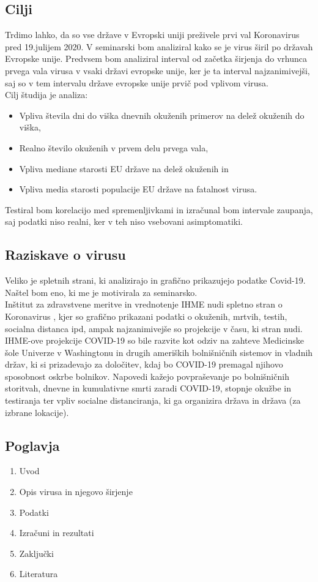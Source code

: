 \documentclass[a4paper,11pt]{article}
\begin{document}
\subsection{Cilji}
Trdimo lahko, da so vse države v Evropski uniji \cite{eu} preživele prvi val Koronavirus pred 19.julijem 2020. V seminarski bom analiziral kako se je virus širil po državah Evropske unije. Predvsem bom analiziral interval od začetka širjenja do vrhunca prvega vala virusa v vsaki državi evropske unije, ker je ta interval najzanimivejši, saj so v tem intervalu države evropske unije prvič pod vplivom virusa. \\
Cilj študija je analiza:
\begin{itemize}
\item{Vpliva števila dni do viška dnevnih okuženih primerov na delež okuženih do viška,}
\item{Realno število okuženih v prvem delu prvega vala,}
\item{Vpliva mediane starosti EU države na delež okuženih in}
\item{Vpliva media starosti populacije EU države na fatalnost virusa.}
\end{itemize}
Testiral bom korelacijo med spremenljivkami in izračunal bom intervale zaupanja, saj podatki niso realni, ker v teh niso vsebovani asimptomatiki.

\subsection{Raziskave o virusu}
Veliko je spletnih strani, ki analizirajo in grafično prikazujejo podatke Covid-19. Naštel bom eno, ki me je motivirala za seminarsko. \\
Inštitut za zdravstvene meritve in vrednotenje IHME nudi spletno stran o Koronavirus \cite{cvd19IHME}, kjer so grafično prikazani podatki o okuženih, mrtvih, testih, socialna distanca ipd, ampak najzanimivejše so projekcije v času, ki stran nudi. IHME-ove projekcije COVID-19 so bile razvite kot odziv na zahteve Medicinske šole Univerze v Washingtonu in drugih ameriških bolnišničnih sistemov in vladnih držav, ki si prizadevajo za določitev, kdaj bo COVID-19 premagal njihovo sposobnost oskrbe bolnikov. Napovedi kažejo povpraševanje po bolnišničnih storitvah, dnevne in kumulativne smrti zaradi COVID-19, stopnje okužbe in testiranja ter vpliv socialne distanciranja, ki ga organizira država in država (za izbrane lokacije).

\subsection{Poglavja}
\begin{enumerate}
\item{Uvod}
\item{Opis virusa in njegovo širjenje}
\item{Podatki}
\item{Izračuni in rezultati}
\item{Zaključki}
\item{Literatura}
\end{enumerate}
\end{document}
